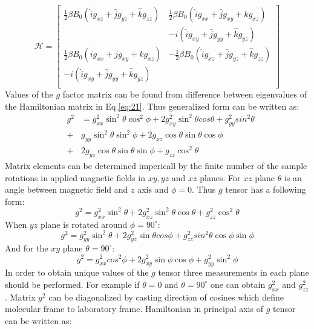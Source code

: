 \begin{equation}\label{eq:21}
\mathcal{H} = \begin{bmatrix}
       \frac{1}{2}\beta B_0( \hat{i}g_{xz}+\hat{j}g_{yz}+\hat{k}g_{zz}) & \frac{1}{2}\beta B_0( \hat{i}g_{xx}+\hat{j}g_{xy}+\hat{k}g_{xz})          \\[0.3em]
  & -i(\hat{i}g_{xy}+\hat{j}g_{yy}+\hat{k}g_{yz}) \\[0.3em]      
       \frac{1}{2}\beta B_0( ig_{xx}+jg_{xy}+kg_{xz})  &  -\frac{1}{2}\beta B_0( \hat{i}g_{xz}+\hat{j}g_{yz}+\hat{k}g_{zz}) \\[0.3em]
        -i(\hat{i}g_{xy}+\hat{j}g_{yy}+\hat{k}g_{yz})  & \\[0.3em]
     \end{bmatrix}
\end{equation}
Values of the $g$ factor matrix can be found from difference between eigenvalues of the Hamiltonian matrix in Eq.\ref{eq:21}. Thus generalized form can be written as: 
\begin{equation}\label{eq:gtengeneral}
\begin{array} {lcl} &g^2& = g_{xx}^2\sin^2\theta\cos^2\phi+2g_{xy}^2\sin^2\theta cos\theta+g_{yy}^2sin^2\theta\\ & + & g_{yy}\sin^2\theta\sin^2\phi+2g_{xz}\cos\theta\sin\theta\cos\phi\\ & + & 2g_{yz}\cos\theta\sin\theta\sin\phi+g_{zz}\cos^2\theta \end{array}
\end{equation}
Matrix elements can be determined impericall by the finite number of the sample rotations in applied magnetic fields in $xy,yz$ and $xz$ planes. For $xz$ plane $\theta$ is an angle between magnetic field and $z$ axis and $\phi=0$. Thus $g$ tensor has a following form:  
\begin{equation}\label{eq:22}
g^2=g_{xx}^2\sin^2\theta+2g_{xz}^2\sin^2\theta \cos\theta+g_{zz}^2\cos^2\theta
\end{equation} 
When $yz$ plane is rotated around $\phi=90^{\circ}$:
\begin{equation}\label{eq:newone22}
g^2=g_{yy}^2\sin^2\theta+2g_{yz}^2\sin\theta cos\phi+g_{zz}^2sin^2\theta\cos\phi\sin\phi
\end{equation} 
And for the $xy$ plane $\theta=90^{\circ}$:
\begin{equation}\label{eq:newone221}
g^2=g_{xx}^2cos^2\phi+2g_{xy}^2\sin\phi\cos\phi+g_{yy}^2\sin^2\phi
\end{equation} 
In order to obtain unique values of the $g$ tensor three measurements in each plane should be performed. For example if $\theta=0$ and $\theta=90^{\circ}$ one can obtain $g^2_{xx}$ and $g^2_{zz}$. Matrix $g^2$ can be diagonalized by casting direction of cosines which define molecular frame to laboratory frame. Hamiltonian in principal axis of $g$ tensor can be written as: 
